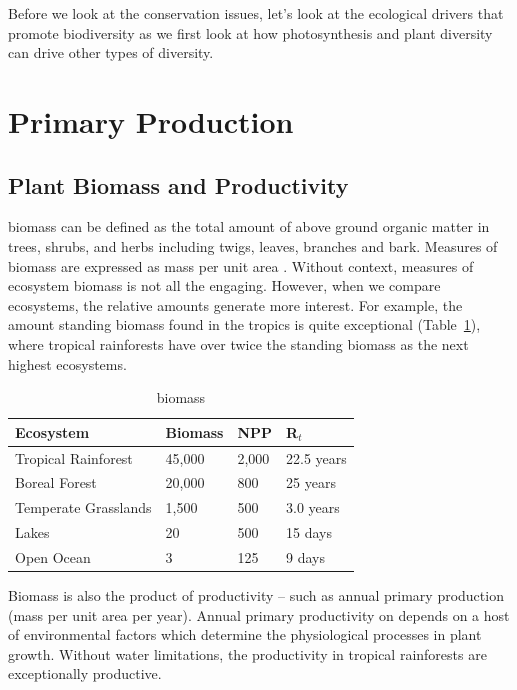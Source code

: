 Before we look at the conservation issues, let's look at the ecological drivers that promote biodiversity as we first look at how photosynthesis and plant diversity can drive other types of diversity. 

\section{Primary Production}

\subsection{Plant Biomass and Productivity}

	
\Gls{biomass} can be defined as the total amount of above ground organic matter in trees, shrubs, and herbs including twigs, leaves, branches and bark. Measures of biomass are expressed as mass per unit area \citep{brown1991biomass}. Without context, measures of ecosystem biomass is not all the engaging. However, when we compare ecosystems, the relative amounts generate more interest. For example, the amount standing biomass found in the tropics is quite exceptional (Table~\ref{tab:biomass}), where tropical rainforests have over twice the standing biomass as the next highest ecosystems. 

\begin{table}[htb]
\centering
		\begin{tabular}{llll}\hline
Ecosystem 						& Biomass	& NPP		& R$_t$ \\ \hline\hline

Tropical Rainforest		& 45,000	& 2,000	& 22.5 years \\
Boreal Forest					& 20,000	& 800		& 25 years \\
Temperate Grasslands	& 1,500		& 500		& 3.0 years \\
Lakes									& 20			& 500		& 15 days\\
Open Ocean						& 3				& 125		& 9 days \\ \hline	
		\end{tabular}
	\caption{biomass}
	\label{tab:biomass}
\end{table}
	
Biomass is also the product of productivity -- such as annual primary production (mass per unit area per year). Annual primary productivity  on depends on a host of environmental factors which determine the physiological processes in plant growth. Without water limitations, the productivity in tropical rainforests are exceptionally productive. 

